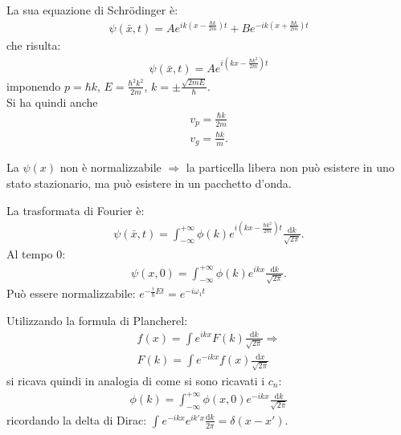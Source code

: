 La sua equazione di Schrödinger è:
\begin{equation}\begin{split}
\psi \left(\bar x,t\right)=Ae^{ik\left(x-\frac{\hbar k}{2m}\right)t}+Be^{-ik\left(x+\frac{\hbar k}{2m}\right)t}
\end{split}\end{equation}
che risulta:
\begin{equation}\begin{split}
\psi \left(\bar x,t\right)=Ae^{i\left(kx-\frac{\hbar k^2}{2m}\right)t}
\end{split}\end{equation}
imponendo $p=\hbar k$, $E=\frac{\hbar ^2k^2}{2m}$, $k=\pm \frac{\sqrt{2mE}}{\hbar }$. \\
Si ha quindi anche 
\begin{equation}\begin{split}
v_p=\frac{\hbar k}{2m}\\
v_g=\frac{\hbar k}{m}.
\end{split}\end{equation}

La $\psi(x)$ non è normalizzabile $\Longrightarrow$ la particella libera non può esistere in uno stato stazionario, ma può esistere in un pacchetto d'onda.

La trasformata di Fourier è:
\begin{equation}\begin{split}
\psi \left(\bar x,t\right)=\int_{-\infty }^{+\infty }{\phi\left(k\right)e^{i\left(kx-\frac{\hbar k^2}{2m}\right)t} \frac{\textrm{d}k}{\sqrt{2\pi }}}.
\end{split}\end{equation}
Al tempo $0$:
\begin{equation}\begin{split}
\psi \left(x,0\right)=\int_{-\infty }^{+\infty }{\phi\left(k\right)e^{ikx} \frac{\textrm{d}k}{\sqrt{2\pi }}}.
\end{split}\end{equation}
Può essere normalizzabile: $e^{-\frac{i}{\hbar}Et}=e^{-i\omega _1t}$

Utilizzando la formula di Plancherel:
\begin{equation}\begin{split}
f\left(x\right)=\int{e^{ikx}F\left(k\right) \frac{\textrm{d}k}{\sqrt{2\pi}}} \Longrightarrow \\
F\left(k\right)=\int{e^{-ikx}f\left(x\right) \frac{\textrm{d}x}{\sqrt{2\pi}}}
\end{split}\end{equation}
si ricava quindi in analogia di come si sono ricavati i $c_n$:
\begin{equation}\begin{split}
\phi\left(k\right)=\int_{-\infty }^{+\infty }{\phi\left(x,0\right)e^{-ikx} \frac{\textrm{d}k}{\sqrt{2\pi }}}
\end{split}\end{equation}
ricordando la delta di Dirac: $\int_{}^{}{e^{-ikx}e^{ik'x} \frac{\textrm{d}k}{2\pi }}=\delta \left(x-x'\right)$.

